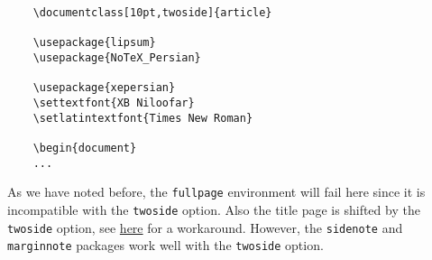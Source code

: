 \documentclass[10pt]{article}
\begin{document}
	\begin{verbatim}
	\documentclass[10pt,twoside]{article}

	\usepackage{lipsum}
	\usepackage{NoTeX_Persian}

	\usepackage{xepersian}
	\settextfont{XB Niloofar}
	\setlatintextfont{Times New Roman}

	\begin{document}
	...
	\end{verbatim}
	As we have noted before, the \texttt{fullpage} environment will fail here since it is incompatible with the \texttt{twoside} option. Also the title page is shifted by the \texttt{twoside} option, see \href{https://tex.stackexchange.com/questions/57158/centered-title-page-in-twoside-report}{here} for a workaround. However, the \texttt{sidenote} and \texttt{marginnote} packages work well with the \texttt{twoside} option. 
\end{document}

